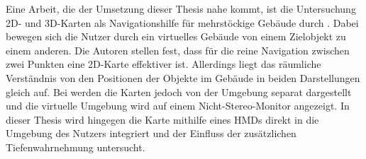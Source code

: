 Eine Arbeit, die der Umsetzung dieser Thesis nahe kommt, ist die Untersuchung 2D- und 3D-Karten als Navigationshilfe für mehrstöckige Gebäude durch \autocite[siehe \autoref{fig:chittaro2006_maps}]{Chittaro2006}.
Dabei bewegen sich die Nutzer durch ein virtuelles Gebäude von einem Zielobjekt zu einem anderen.
Die Autoren stellen fest, dass für die reine Navigation zwischen zwei Punkten eine 2D-Karte effektiver ist.
Allerdings liegt das räumliche Verständnis von den Positionen der Objekte im Gebäude in beiden Darstellungen gleich auf.
Bei \parencite{Chittaro2006} werden die Karten jedoch von der Umgebung separat dargestellt und die virtuelle Umgebung wird auf einem Nicht-Stereo-Monitor angezeigt.
In dieser Thesis wird hingegen die Karte mithilfe eines HMDs direkt in die Umgebung des Nutzers integriert und der Einfluss der zusätzlichen Tiefenwahrnehmung untersucht.
